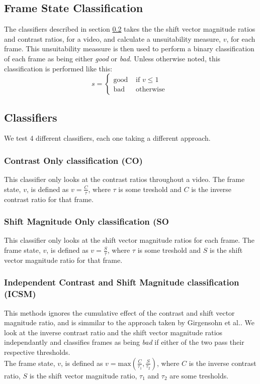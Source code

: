\subsection{Frame State Classification}
%
The classifiers described in section \ref{sec:algorithms} takes the the shift vector magnitude ratios and contrast ratios, for a video, and calculate a unsuitability measure, $v$, for each frame. This unsuitability meassure is then used to perform a binary classification of each frame as being either \textit{good} or \textit{bad}. Unless otherwise noted, this classification is performed like this:
\[
s = 
\begin{cases}
\text{good} & \text{ if } v \leq 1\\
\text{bad} & \text{ otherwise }
\end{cases}
\]
%
\subsection{Classifiers}\label{sec:algorithms}
%
We test 4 different classifiers, each one taking a different approach.
%
\subsubsection{Contrast Only classification (CO)}
%
This classifier only looks at the contrast ratios throughout a video. The frame state, $v$, is defined as $v=\frac{C}{\tau}$, where $\tau$ is some treshold and $C$ is the inverse contrast ratio for that frame.
%
\subsubsection{Shift Magnitude Only classification (SO}
%
This classifier only looks at the shift vector magnitude ratios for each frame. The frame state, $v$, is defined as $v=\frac{S}{\tau}$, where $\tau$ is some treshold and $S$ is the shift vector magnitude ratio for that frame.
%
\subsubsection{Independent Contrast and Shift Magnitude classification (ICSM)}
%
This methods ignores the cumulative effect of the contrast and shift vector magnitude ratio, and is simmilar to the approach taken by Girgensohn et al.\cite{Girgensohn:2000:SAH:354401.354415}. We look at the inverse contrast ratio and the shift vector magnitude ratios independantly and classifies frames as being \textit{bad} if either of the two pass their respective thresholds.\\
The frame state, $v$, is defined as $v=\text{max}(\frac{C}{\tau_1}, \frac{S}{\tau_2})$, where $C$ is the inverse contrast ratio, $S$ is the shift vector magnitude ratio, $\tau_1$ and $\tau_2$ are some tresholds.
%
